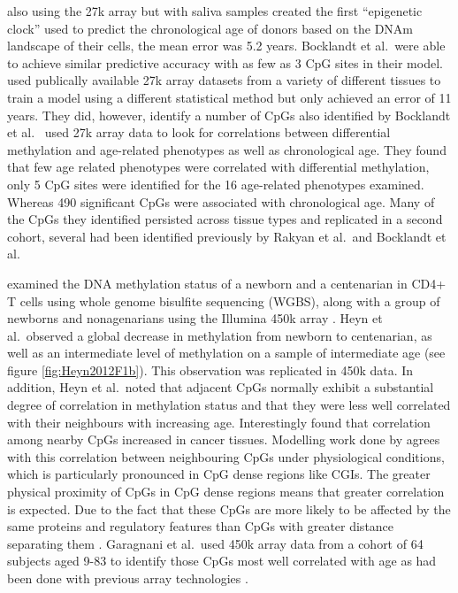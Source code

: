 \documentclass[
]{book}
\begin{document}
\citet{Bocklandt2011} also using the 27k array but with saliva samples created the first ``epigenetic clock'' used to predict the chronological age of donors based on the DNAm landscape of their cells, the mean error was 5.2 years. Bocklandt et al.~were able to achieve similar predictive accuracy with as few as 3 CpG sites in their model. \citet{Koch2011} used publically available 27k array datasets from a variety of different tissues to train a model using a different statistical method but only achieved an error of 11 years. They did, however, identify a number of CpGs also identified by Bocklandt et al.~\citet{Bell2012} used 27k array data to look for correlations between differential methylation and age-related phenotypes as well as chronological age. They found that few age related phenotypes were correlated with differential methylation, only 5 CpG sites were identified for the 16 age-related phenotypes examined. Whereas 490 significant CpGs were associated with chronological age. Many of the CpGs they identified persisted across tissue types and replicated in a second cohort, several had been identified previously by Rakyan et al.~and Bocklandt et al.

\citet{Heyn2012} examined the DNA methylation status of a newborn and a centenarian in CD4+ T cells using whole genome bisulfite sequencing (WGBS), along with a group of newborns and nonagenarians using the Illumina 450k array \citep{Bibikova2011}. Heyn et al.~observed a global decrease in methylation from newborn to centenarian, as well as an intermediate level of methylation on a sample of intermediate age (see figure \ref{fig:Heyn2012F1b}). This observation was replicated in 450k data. In addition, Heyn et al.~noted that adjacent CpGs normally exhibit a substantial degree of correlation in methylation status and that they were less well correlated with their neighbours with increasing age. Interestingly \citet{Jenkinson2017} found that correlation among nearby CpGs increased in cancer tissues. Modelling work done by \citet{Affinito2016} agrees with this correlation between neighbouring CpGs under physiological conditions, which is particularly pronounced in CpG dense regions like CGIs. The greater physical proximity of CpGs in CpG dense regions means that greater correlation is expected. Due to the fact that these CpGs are more likely to be affected by the same proteins and regulatory features than CpGs with greater distance separating them \citep{Haerter2014}. Garagnani et al.~used 450k array data from a cohort of 64 subjects aged 9-83 to identify those CpGs most well correlated with age as had been done with previous array technologies \citep{Garagnani2012}.
\end{document}
